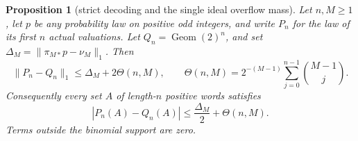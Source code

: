 \documentclass[11pt]{article}
\newtheorem{proposition}{Proposition}
\theoremstyle{remark}\newtheorem{remark}[proposition]{Remark}
\begin{document}
\begin{proposition}[strict decoding and the single ideal overflow mass]
\label{prop:mazur-truncation-transport}
Let $n,M\ge1$, let $p$ be any probability law on positive odd
integers, and write $P_n$ for the law of its first $n$ actual valuations.
Let $Q_n=\operatorname{Geom}(2)^n$, and set
$\Delta_M=\|\pi_{M*}p-\nu_M\|_1$.
Then
\begin{equation}
 \|P_n-Q_n\|_1\le\Delta_M+2\Theta(n,M),\qquad
 \Theta(n,M)=2^{-(M-1)}
       \sum_{j=0}^{n-1}\binom{M-1}{j}.
 \label{eq:mazur-truncation-transport}
\end{equation}
Consequently every set $A$ of length-$n$ positive words satisfies
\begin{equation}
 |P_n(A)-Q_n(A)|\le\frac{\Delta_M}{2}+\Theta(n,M).
 \label{eq:mazur-event-half}
\end{equation}
Terms outside the binomial support are zero.
\end{proposition}
\end{document}
